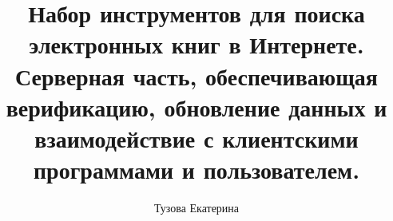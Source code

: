 \documentclass[a4paper]{article}
\begin{document}
\author{Тузова Екатерина}
\title{Набор инструментов для поиска электронных книг в Интернете. Серверная часть, обеспечивающая верификацию, обновление данных и взаимодействие с клиентскими программами и пользователем.}
\maketitle



\tableofcontents
\newpage














\end{document}
